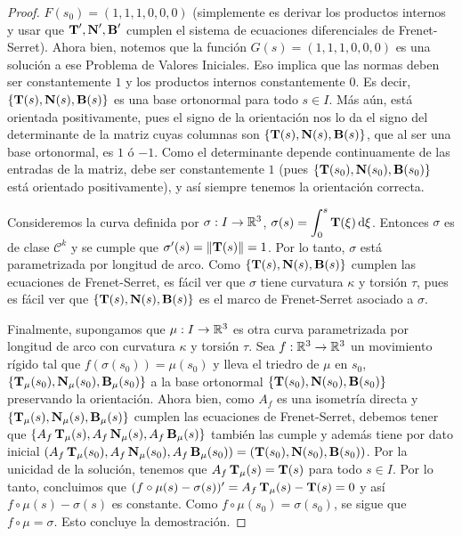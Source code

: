 \begin{teo}
\begin{proof}
$F(s_0)=(1,1,1,0,0,0)$ (simplemente es derivar los productos internos y usar que $\operatorname{\mathbf{T}}',\operatorname{\mathbf{N}}',\operatorname{\mathbf{B}}'$ cumplen el sistema de ecuaciones diferenciales de Frenet-Serret). Ahora bien, notemos que la función $G(s)=(1,1,1,0,0,0)$ es una solución a ese Problema de Valores Iniciales. Eso implica que las normas deben ser constantemente $1$ y los productos internos constantemente $0$. Es decir, $\{\operatorname{\mathbf{T}}(s),\operatorname{\mathbf{N}}(s),\operatorname{\mathbf{B}}(s)\}$ es una base ortonormal para todo $s\in I$. Más aún, está orientada positivamente, pues el signo de la orientación nos lo da el signo del determinante de la matriz cuyas columnas son $\{\operatorname{\mathbf{T}}(s),\operatorname{\mathbf{N}}(s),\operatorname{\mathbf{B}}(s)\}$, que al ser una base ortonormal, es $1$ ó $-1$. Como el determinante depende continuamente de las entradas de la matriz, debe ser constantemente $1$ (pues $\{\operatorname{\mathbf{T}}(s_0),\operatorname{\mathbf{N}}(s_0),\operatorname{\mathbf{B}}(s_0)\}$ está orientado positivamente), y así siempre tenemos la orientación correcta.

Consideremos la curva definida por $\sigma:I\to\mathbb{R}^3$, $\sigma(s)=\displaystyle\int_{0}^s \operatorname{\mathbf{T}}(\xi)\mathop{}\!\mathrm{d}\xi$. Entonces $\sigma$ es de clase $\mathscr{C}^k$ y se cumple que $\sigma'(s)=\left\| \operatorname{\mathbf{T}}(s) \right\|=1$. Por lo tanto, $\sigma$ está parametrizada por longitud de arco. Como $\{\operatorname{\mathbf{T}}(s),\operatorname{\mathbf{N}}(s),\operatorname{\mathbf{B}}(s)\}$ cumplen las ecuaciones de Frenet-Serret, es fácil ver que $\sigma$ tiene curvatura $\kappa$ y torsión $\tau$, pues es fácil ver que $\{\operatorname{\mathbf{T}}(s),\operatorname{\mathbf{N}}(s),\operatorname{\mathbf{B}}(s)\}$ es el marco de Frenet-Serret asociado a $\sigma$.

Finalmente, supongamos que $\mu:I\to\mathbb{R}^3$ es otra curva parametrizada por longitud de arco con curvatura $\kappa$ y torsión $\tau$. Sea $f:\mathbb{R}^3\to\mathbb{R}^3$ un movimiento rígido tal que $f(\sigma(s_0))=\mu(s_0)$ y lleva el triedro de $\mu$ en $s_0$, $\{\operatorname{\mathbf{T}}_\mu(s_0),\operatorname{\mathbf{N}}_\mu(s_0),\operatorname{\mathbf{B}}_\mu(s_0)\}$ a la base ortonormal $\{\operatorname{\mathbf{T}}(s_0),\operatorname{\mathbf{N}}(s_0),\operatorname{\mathbf{B}}(s_0)\}$ preservando la orientación. Ahora bien, como $A_f$ es una isometría directa y $\{\operatorname{\mathbf{T}}_\mu(s),\operatorname{\mathbf{N}}_\mu(s),\operatorname{\mathbf{B}}_\mu(s)\}$ cumplen las ecuaciones de Frenet-Serret, debemos tener que $\{A_f\operatorname{\mathbf{T}}_\mu(s),A_f\operatorname{\mathbf{N}}_\mu(s),A_f\operatorname{\mathbf{B}}_\mu(s)\}$ también las cumple y además tiene por dato inicial $(A_f\operatorname{\mathbf{T}}_\mu(s_0),A_f\operatorname{\mathbf{N}}_\mu(s_0),A_f\operatorname{\mathbf{B}}_\mu(s_0))=(\operatorname{\mathbf{T}}(s_0),\operatorname{\mathbf{N}}(s_0),\operatorname{\mathbf{B}}(s_0))$. Por la unicidad de la solución, tenemos que $A_f\operatorname{\mathbf{T}}_\mu(s)=\operatorname{\mathbf{T}}(s)$ para todo $s\in I$. Por lo tanto, concluimos que $(f\circ \mu(s) - \sigma(s))' = A_f\operatorname{\mathbf{T}}_\mu(s)-\operatorname{\mathbf{T}}(s) = 0$ y así $f\circ\mu(s)-\sigma(s)$ es constante. Como $f\circ\mu(s_0)=\sigma(s_0)$, se sigue que $f\circ\mu =\sigma$. Esto concluye la demostración.
\end{proof}
\end{teo}

